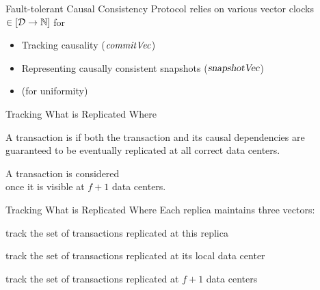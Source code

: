 
\begin{frame}{Fault-tolerant Causal Consistency Protocol}
  \unistore{} relies on various vector clocks $\in [\mathcal{D} \to \mathbb{N}]$ for \\[6pt]

  \begin{itemize}
    \setlength{\itemsep}{8pt}
    \item Tracking causality ($\mathit{commitVec}$)
    \item Representing causally consistent snapshots ($\textsl{snapshotVec}$)
    \item {} (for uniformity)
  \end{itemize}
\end{frame}

\begin{frame}{Tracking What is Replicated Where}
  \begin{center}

    \begin{definition}[Uniform]
      A transaction is  if both the transaction
      and its causal dependencies are guaranteed to be eventually
      replicated at all correct data centers.
    \end{definition}

    \pause
    \vspace{0.50cm}
    A transaction is considered  \\[3pt]
    once it is visible at $f + 1$ data centers.
  \end{center}
\end{frame}

\begin{frame}{Tracking What is Replicated Where}
  Each replica maintains three vectors: \\[5pt]

  \begin{description}[<+->]
    \setlength{\itemsep}{10pt}
    \item[$\knownVC$:] track the set of transactions replicated at this replica
    \item[$\stableVC$:] track the set of transactions replicated at its local data center
    \item[$\uniformVC$:] track the set of transactions replicated at $f + 1$ data centers
  \end{description}
\end{frame}

